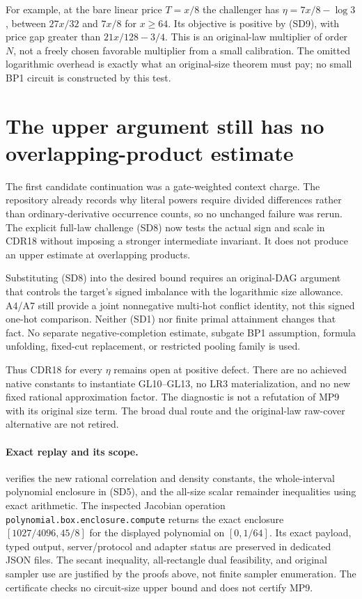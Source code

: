 \documentclass[11pt]{article}
\begin{document}
For example, at the bare linear price $T=x/8$ the challenger has
$\eta=7x/8-\log3$, between $27x/32$ and $7x/8$ for $x\ge64$.
Its objective is positive by (SD9), with price gap greater than
$21x/128-3/4$. This is an original-law multiplier of order $N$,
not a freely chosen favorable multiplier from a small calibration.
The omitted logarithmic overhead is exactly what an original-size
theorem must pay; no small BP1 circuit is constructed by this test.

\section{The upper argument still has no overlapping-product estimate}
The first candidate continuation was a gate-weighted context charge.
The repository already records why literal powers require divided
differences rather than ordinary-derivative occurrence counts,
so no unchanged failure was rerun.
The explicit full-law challenge (SD8) now tests the actual sign and
scale in CDR18 without imposing a stronger intermediate invariant.
It does not produce an upper estimate at overlapping products.

Substituting (SD8) into the desired bound requires an original-DAG
argument that controls the target's signed imbalance with the
logarithmic size allowance. A4/A7 still provide a joint nonnegative
multi-hot conflict identity, not this signed one-hot comparison.
Neither (SD1) nor finite primal attainment changes that fact.
No separate negative-completion estimate, subgate BP1 assumption,
formula unfolding, fixed-cut replacement, or restricted pooling
family is used.

Thus CDR18 for every $\eta$ remains open at positive defect.
There are no achieved native constants to instantiate GL10--GL13,
no LR3 materialization, and no new fixed rational approximation
factor. The diagnostic is not a refutation of MP9 with its original
size term. The broad dual route and the original-law raw-cover
alternative are not retired.

\paragraph{Exact replay and its scope.}
 verifies the new rational
correlation and density constants, the whole-interval polynomial
enclosure in (SD5), and the all-size scalar remainder inequalities
using exact arithmetic. The inspected Jacobian operation
\texttt{polynomial.box.enclosure.compute} returns the exact enclosure
$[1027/4096,45/8]$ for the displayed polynomial on $[0,1/64]$.
Its exact payload, typed output, server/protocol and adapter status
are preserved in dedicated JSON files.
The secant inequality, all-rectangle dual feasibility, and original
sampler use are justified by the proofs above, not finite sampler
enumeration. The certificate checks no circuit-size upper bound
and does not certify MP9.
\end{document}
